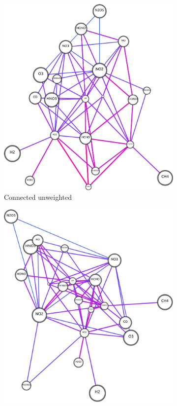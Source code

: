 \begin{figure}[H]
     \centering
    \begin{subfigure}[b]{.4\textwidth}
         \centering
     \includegraphics[width=\textwidth]{figures_c1/tap3/ch4_stretcheddefault-eps-converted-to.pdf}
     \caption{Connected unweighted}
     \end{subfigure}
     \begin{subfigure}[b]{.4\textwidth}
         \centering
     \includegraphics[width=\textwidth]{figures_c1/tap3/ch4_weighted_s1-eps-converted-to.pdf}

\end{subfigure}
\end{figure}
